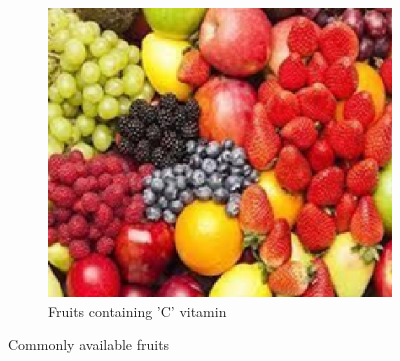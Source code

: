 \begin{figure}[h!]
\begin{subfigure}[b]{0.45\linewidth}
        \includegraphics[width=\textwidth]{images/image3.png} %
        \caption{Fruits containing 'C' vitamin}
        \label{fig:fruitsC}
    \end{subfigure}
    
    \caption{Commonly available fruits}
    \label{fig:common_fruits}
\end{figure}